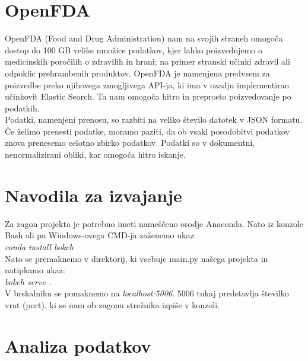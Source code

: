 \documentclass[a4paper,10pt]{article}
\begin{document}
\section{OpenFDA}
OpenFDA (Food and Drug Administration) nam na svojih straneh omogoča dostop do 100 GB velike množice podatkov, kjer lahko poizvedujemo o medicinskih poročilih o zdravilih in hrani; na primer stranski učinki zdravil ali odpoklic prehrambenih produktov. OpenFDA je namenjena predvsem za poizvedbe preko njihovega zmogljivega API-ja, ki ima v ozadju implementiran učinkovit Elastic Search. Ta nam omogoča hitro in preprosto poizvedovanje po podatkih. \\
Podatki, namenjeni prenosu, so razbiti na veliko število datotek v JSON formatu. Če želimo prenesti podatke, moramo paziti, da ob vsaki posodobitvi podatkov znova prenesemo celotno zbirko podatkov. Podatki so v dokumentni, nenormalizirani obliki, kar omogoča hitro iskanje.
\section{Navodila za izvajanje}
Za zagon projekta je potrebno imeti nameščeno orodje Anaconda. Nato iz konzole Bash ali pa Windows-ovega CMD-ja zaženemo ukaz: \\ \textit{conda install bokeh} \\
Nato se premaknemo v direktorij, ki vsebuje main.py našega projekta in natipkamo ukaz: \\ \textit{bokeh serve .} \\ V brskalniku se pomaknemo na \textit{localhost:5006}. 5006 tukaj predstavlja številko vrat (port), ki se nam ob zagonu strežnika izpiše v konzoli. 
\section{Analiza podatkov}
\end{document}
